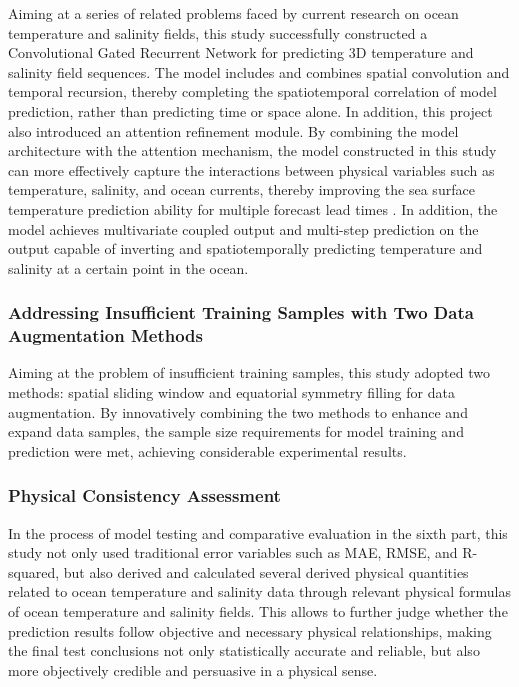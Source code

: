 \documentclass[webpdf,contemporary,large]{oup-authoring-template}
\begin{document}
Aiming at a series of related problems faced by current research on ocean temperature and salinity fields, this study successfully constructed a Convolutional Gated Recurrent Network for predicting 3D temperature and salinity field sequences. The model includes and combines spatial convolution and temporal recursion, thereby completing the spatiotemporal correlation of model prediction, rather than predicting time or space alone. In addition, this project also introduced an attention refinement module. By combining the model architecture with the attention mechanism, the model constructed in this study can more effectively capture the interactions between physical variables such as temperature, salinity, and ocean currents, thereby improving the sea surface temperature prediction ability for multiple forecast lead times \cite{yangMultiFactorDeepLearning2025}. In addition, the model achieves multivariate coupled output and multi-step prediction on the output capable of inverting and spatiotemporally predicting temperature and salinity at a certain point in the ocean.

\subsubsection{Addressing Insufficient Training Samples with Two Data Augmentation Methods}

Aiming at the problem of insufficient training samples, this study adopted two methods: spatial sliding window and equatorial symmetry filling for data augmentation. By innovatively combining the two methods to enhance and expand data samples, the sample size requirements for model training and prediction were met, achieving considerable experimental results.

\subsubsection{Physical Consistency Assessment}

In the process of model testing and comparative evaluation in the sixth part, this study not only used traditional error variables such as MAE, RMSE, and R-squared, but also derived and calculated several derived physical quantities related to ocean temperature and salinity data through relevant physical formulas of ocean temperature and salinity fields. This allows to further judge whether the prediction results follow objective and necessary physical relationships, making the final test conclusions not only statistically accurate and reliable, but also more objectively credible and persuasive in a physical sense.
\end{document}
